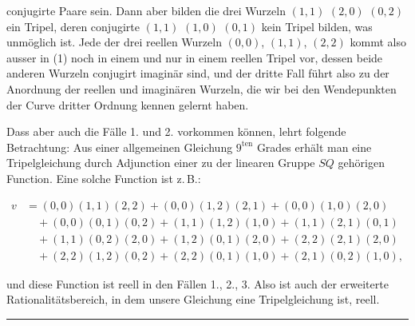 conjugirte Paare sein. Dann aber bilden die drei Wurzeln $(1,1)$ $(2,0)$ $(0,2)$ ein Tripel, deren conjugirte $(1,1)$ $(1,0)$ $(0,1)$ kein Tripel bilden, was unmöglich ist. Jede der drei reellen Wurzeln $(0,0)$, $(1,1)$, $(2,2)$ kommt also ausser in (1) noch in einem und nur in einem reellen Tripel vor, dessen beide anderen Wurzeln conjugirt imaginär sind, und der dritte Fall führt also zu der Anordnung der reellen und imaginären Wurzeln, die wir bei den Wendepunkten der Curve dritter Ordnung kennen gelernt haben.

Dass aber auch die Fälle 1. und 2. vorkommen können, lehrt folgende Betrachtung: Aus einer allgemeinen Gleichung $9^{\text{ten}}$ Grades erhält man eine Tripelgleichung durch Adjunction einer zu der linearen Gruppe $SQ$ gehörigen Function. Eine solche Function ist z.\,B.:

\[
\begin{aligned}
v &= (0,0)(1,1)(2,2) + (0,0)(1,2)(2,1) + (0,0)(1,0)(2,0) \\
&\quad + (0,0)(0,1)(0,2) + (1,1)(1,2)(1,0) + (1,1)(2,1)(0,1) \\
&\quad + (1,1)(0,2)(2,0) + (1,2)(0,1)(2,0) + (2,2)(2,1)(2,0) \\
&\quad + (2,2)(1,2)(0,2) + (2,2)(0,1)(1,0) + (2,1)(0,2)(1,0),
\end{aligned}
\]

und diese Function ist reell in den Fällen 1., 2., 3. Also ist auch der erweiterte Rationalitätsbereich, in dem unsere Gleichung eine Tripelgleichung ist, reell.

\begin{center}
\rule{0.22\textwidth}{0.4pt}
\end{center}

